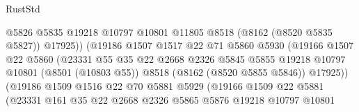 \begin{lexlean}{RustStd}
\begin{coremodule}
                                      @5826
                                      @5835
                                      @19218
                                      @10797
                                      @10801
                                      @11805
                                      @8518
                                      (@8162 (@8520 @5835 @5827))
                                      @17925))
                                  (@19186
                                    @1507
                                    @1517
                                    @22
                                    @71
                                    @5860
                                    @5930
                                    (@19166
                                      @1507
                                      @22
                                      @5860
                                      (@23331
                                        @55
                                        @35
                                        @22
                                        @2668
                                        @2326
                                        @5845
                                        @5855
                                        @19218
                                        @10797
                                        @10801
                                        (@8501 (@10803 @55))
                                        @8518
                                        (@8162 (@8520 @5855 @5846))
                                        @17925))
                                    (@19186
                                      @1509
                                      @1516
                                      @22
                                      @70
                                      @5881
                                      @5929
                                      (@19166
                                        @1509
                                        @22
                                        @5881
                                        (@23331
                                          @161
                                          @35
                                          @22
                                          @2668
                                          @2326
                                          @5865
                                          @5876
                                          @19218
                                          @10797
                                          @10801

\end{coremodule}
\end{lexlean}

